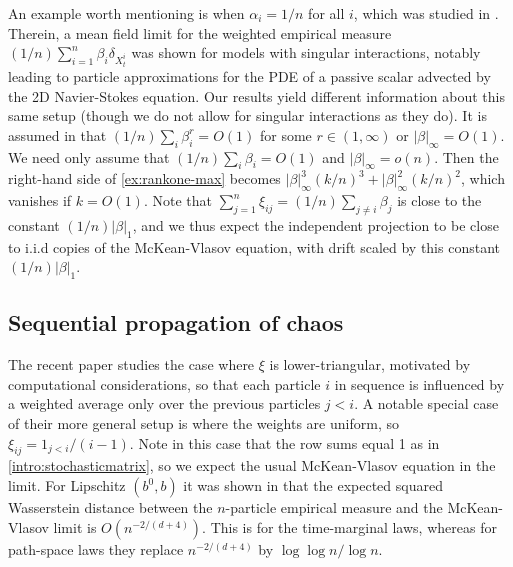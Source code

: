 \documentclass[11pt,reqno]{amsart}
\numberwithin{equation}{section}
\theoremstyle{definition}
\begin{document}
An example worth mentioning is when $\alpha_i=1/n$ for all $i$, which was studied in \cite{wang2022mean}. Therein, a mean field limit for the weighted empirical measure $(1/n)\sum_{i=1}^n\beta_i\delta_{X^i_t}$ was shown for models with singular interactions, notably leading to particle approximations for the PDE of a passive scalar advected by the 2D Navier-Stokes equation.
Our results yield different information about this same setup (though we do not allow for singular interactions as they do).
It is assumed in \cite{wang2022mean} that $(1/n) \sum_i \beta_i^r = O(1)$ for some $r \in (1,\infty)$ or $|\beta|_\infty = O(1)$. We need only assume that $(1/n) \sum_i \beta_i  = O(1)$ and  $|\beta|_\infty = o(n)$.
Then the right-hand side of \eqref{ex:rankone-max} becomes $|\beta|_\infty^3 (k/n)^3+|\beta|_\infty^2 (k/n)^2$, which vanishes  if $k=O(1)$.
Note that $\sum_{j=1}^n\xi_{ij} = (1/n)\sum_{j \neq i} \beta_j$ is close to the constant $(1/n)|\beta|_1$, and we thus expect the independent projection to be close to i.i.d copies of the McKean-Vlasov equation, with drift scaled by this constant $(1/n)|\beta|_1$.



\subsection{Sequential propagation of chaos} \label{se:sequentialpoc}

The recent paper \cite{du2023sequential} studies  the case  where $\xi$ is lower-triangular, motivated by computational considerations, so that each particle $i$ in sequence is influenced by a weighted average only  over the previous particles $j < i$. 
A notable special case of their more general setup is where the weights are uniform, so $\xi_{ij} = 1_{j < i}/(i-1)$. Note in this case that the row sums equal 1 as in \eqref{intro:stochasticmatrix}, so we expect the usual McKean-Vlasov equation in the limit. For Lipschitz $(b^0,b)$ it was shown in \cite[Theorem 2.1]{du2023sequential} that the expected squared Wasserstein distance between the $n$-particle empirical measure and the McKean-Vlasov limit is $O(n^{-2/(d+4)})$. 
 This is for the time-marginal laws, whereas for path-space laws they replace $n^{-2/(d+4)}$ by $\log\log n / \log n$.
\end{document}
